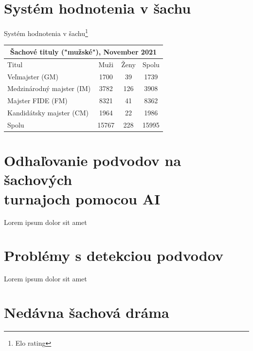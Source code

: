 \documentclass[10pt,oneside,slovak,a4paper]{article}
\begin{document}
\vspace*{\fill}

\section{Systém hodnotenia v šachu}
Systém hodnotenia v šachu\footnote{Elo rating} 




\begin{table}[H]
		\def\arraystretch{1.5}
		\begin{tabular}{|lccc|}
			\hline
			\multicolumn{4}{|c|}{Šachové tituly ("mužské"), November 2021}                                                     \\ \hline
			\multicolumn{1}{|l|}{Titul}                       & \multicolumn{1}{c|}{Muži}  & \multicolumn{1}{c|}{Ženy} & Spolu \\ \hline
			\multicolumn{1}{|l|}{Veľmajster (GM)}             & \multicolumn{1}{c|}{1700}  & \multicolumn{1}{c|}{39}   & 1739  \\ \hline
			\multicolumn{1}{|l|}{Medzinárodný   majster (IM)} & \multicolumn{1}{c|}{3782}  & \multicolumn{1}{c|}{126}  & 3908  \\ \hline
			\multicolumn{1}{|l|}{Majster FIDE   (FM)}         & \multicolumn{1}{c|}{8321}  & \multicolumn{1}{c|}{41}   & 8362  \\ \hline
			\multicolumn{1}{|l|}{Kandidátsky   majster (CM)}  & \multicolumn{1}{c|}{1964}  & \multicolumn{1}{c|}{22}   & 1986  \\ \hline
			\multicolumn{1}{|l|}{Spolu}                       & \multicolumn{1}{c|}{15767} & \multicolumn{1}{c|}{228}  & 15995 \\ \hline
		\end{tabular}
\end{table}

\section{Odhaľovanie podvodov na šachových\\
	 turnajoch pomocou AI}

Lorem ipsum dolor sit amet


\section{Problémy s detekciou podvodov}

Lorem ipsum dolor sit amet


\section{Nedávna šachová dráma}
\end{document}
